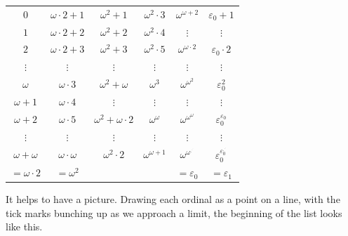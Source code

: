 \documentclass[a4paper]{scrartcl}
\begin{document}
\begin{center}
  \small
  \begin{tabular}{cccccc}
    $0$ & $\omega\cdot 2 + 1$ & $\omega^2 + 1$ & $\omega^2\cdot 3$ & $\omega^{\omega + 2}$ & $\varepsilon_0 + 1$ \\
    $1$ & $\omega\cdot 2 + 2$ & $\omega^2 + 2$ & $\omega^2\cdot 4$ & $\vdots$ & $\vdots$ \\
    $2$ & $\omega\cdot 2 + 3$ & $\omega^2 + 3$ & $\omega^2\cdot 5$ & $\omega^{\omega \cdot 2}$ & $\varepsilon_0 \cdot 2$ \\
    $\vdots$ & $\vdots$ & $\vdots$ & $\vdots$ & $\vdots$ & $\vdots$ \\
    $\omega$ & $\omega\cdot 3$ & $\omega^2 + \omega$ & $\omega^3$ & $\omega^{\omega^2}$ & $\varepsilon_0^2$ \\
    $\omega + 1$ & $\omega\cdot 4$ & $\vdots$ & $\vdots$ & $\vdots$ & $\vdots$ \\
    $\omega + 2$ & $\omega\cdot 5$ & $\omega^2 + \omega \cdot 2$ & $\omega^\omega$ & $\omega^{\omega^{\omega}}$ & $\varepsilon_0^{\varepsilon_0}$ \\
    $\vdots$ & $\vdots$ & $\vdots$ & $\vdots$ & $\vdots$ & $\vdots$ \\
    $\omega + \omega$ & $\omega\cdot \omega $ & $\omega^2 \cdot 2$ & $\omega^{\omega + 1}$ & $\omega^{\omega^{.^{.^.}}}$ & $\varepsilon_0^{\varepsilon_0^{.^{.^.}}}$ \\
    $=\omega\cdot 2$ & $=\omega^2$ & &  & $= \varepsilon_0$ & $= \varepsilon_1$ \\
  \end{tabular}
\end{center}

It helps to have a picture. Drawing each ordinal as a point on a line, with the tick marks bunching up as we approach a limit, the beginning of the list looks like this.

\begin{center}
\end{center}
\end{document}
